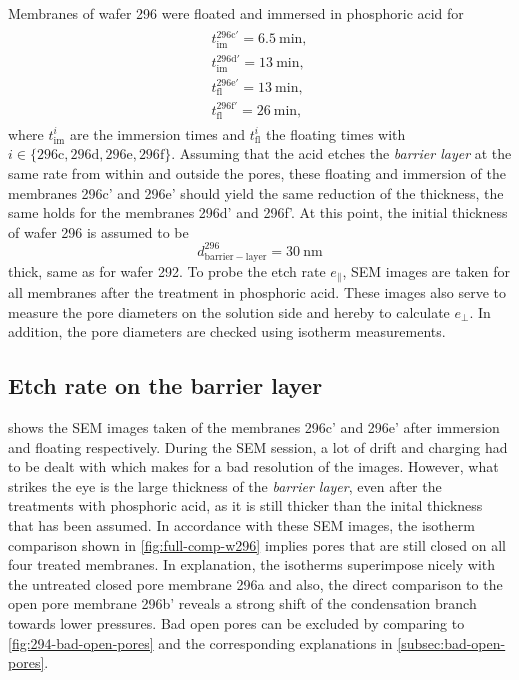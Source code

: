 \documentclass[../thesis.tex]{subfiles}
\begin{document}
        Membranes of wafer 296 were floated and immersed in phosphoric acid for
        \begin{align*}
            \begin{split}
                t_\mathrm{im}^\mathrm{296c'}=\SI{6,5}{\minute}, \\
                t_\mathrm{im}^\mathrm{296d'}=\SI{13}{\minute},  \\
                t_\mathrm{fl}^\mathrm{296e'}=\SI{13}{\minute}, \\
                t_\mathrm{fl}^\mathrm{296f'}=\SI{26}{\minute},
            \end{split}
        \end{align*}
        where $t_\mathrm{im}^{i}$ are the immersion times and $t_\mathrm{fl}^{i}$ the floating times with $i\in \{ \mathrm{296c,296d,296e,296f}\}$. Assuming that the acid etches the \textit{barrier layer} at the same rate from within and outside the pores, these floating and immersion of the membranes 296c' and 296e' should yield the same reduction of the thickness, the same holds for the membranes 296d' and 296f'. At this point, the initial thickness of wafer 296 is assumed to be
        \begin{equation*}
          d_\mathrm{barrier-layer}^\mathrm{296} =\SI{30}{\nano\meter}
        \end{equation*}
        thick, same as for wafer 292. To probe the etch rate $e_\parallel$, SEM images are taken for all membranes after the treatment in phosphoric acid. These images also serve to measure the pore diameters on the solution side and hereby to calculate $e_\perp$. In addition, the pore diameters are checked using isotherm measurements.


        \subsection{Etch rate on the barrier layer}
        \label{subsec:etch-rate}

          

           shows the SEM images taken of the membranes 296c' and 296e' after immersion and floating respectively. During the SEM session, a lot of drift and charging had to be dealt with which makes for a bad resolution of the images. However, what strikes the eye is the large thickness of the \textit{barrier layer}, even after the treatments with phosphoric acid, as it is still thicker than the inital thickness that has been assumed. In accordance with these SEM images, the isotherm comparison shown in \cref{fig:full-comp-w296} implies pores that are still closed on all four treated membranes. In explanation, the isotherms superimpose nicely with the untreated closed pore membrane 296a and also, the direct comparison to the open pore membrane 296b' reveals a strong shift of the condensation branch towards lower pressures. Bad open pores can be excluded by comparing to \cref{fig:294-bad-open-pores} and the corresponding explanations in \cref{subsec:bad-open-pores}.
\end{document}
